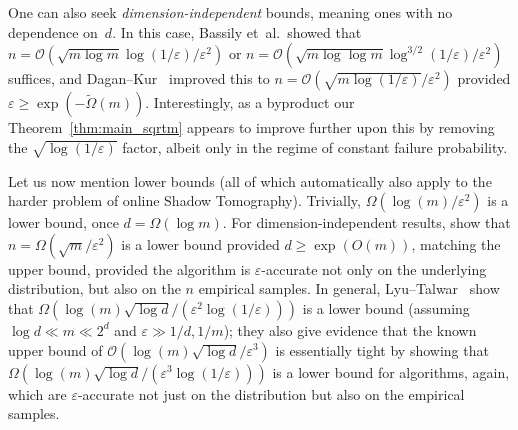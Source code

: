 \documentclass[10pt]{article}
\newcommand{\eps}{\epsilon}
\newcommand{\wt}[1]{\widetilde{#1}}
\renewcommand{\epsilon}{\varepsilon}
\begin{document}
One can also seek \emph{dimension-independent} bounds, meaning ones with no dependence on~$d$.  In this case, Bassily et~al.\ showed that $n = \mathcal{O}(\sqrt{m \log m} \log(1/\eps)/\eps^2)$  or $n = \mathcal{O}(\sqrt{m \log \log m} \log^{3/2}(1/\eps)/\eps^2)$ suffices, and Dagan--Kur~\cite{DK22} improved this to $n = \mathcal{O}(\sqrt{m \log(1/\eps)}/\eps^2)$ provided $\eps \geq \exp(-\wt{\Omega}(m))$. Interestingly, as a byproduct our Theorem~\ref{thm:main_sqrtm} appears to improve further upon this by removing the $\sqrt{\log(1/\epsilon)}$ factor, albeit only in the regime of constant failure probability.

Let us now mention lower bounds (all of which automatically also apply to the harder problem of online Shadow Tomography).  Trivially, $\Omega(\log(m)/\eps^2)$ is a lower bound, once $d = \Omega(\log m)$.  For dimension-independent results, \cite{NSSSU18} show that $n = \Omega(\sqrt{m}/\eps^2)$ is a lower bound provided $d \geq \exp(O(m))$, matching the upper bound, provided the algorithm is $\eps$-accurate not only on the underlying distribution, but also on the $n$ empirical samples.  In general, Lyu--Talwar~\cite{lyu2025fingerprinting} show that $\Omega(\log(m)\sqrt{\log d}/(\eps^2 \log(1/\eps)))$ is a lower bound (assuming $\log d \ll m \ll 2^d$ and $\eps \gg 1/d, 1/m$); they also give evidence that the known upper bound of $\mathcal{O}(\log(m) \sqrt{\log d}/\eps^3)$ is essentially tight by showing that $\Omega(\log(m) \sqrt{\log d}/(\eps^3 \log(1/\eps)))$ is a lower bound for algorithms, again, which are $\eps$-accurate not just on the distribution but also on the empirical samples.




\end{document}
